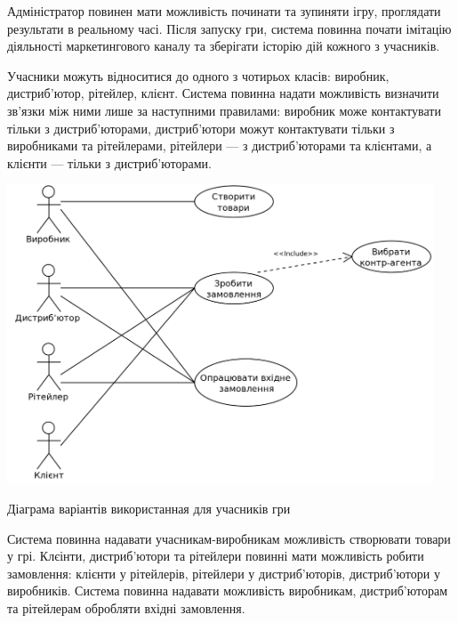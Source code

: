 \begin{longEnumerate}
\item Адміністратор повинен мати можливість починати та зупиняти ігру, проглядати результати в реальному часі. Після запуску гри, система повинна почати імітацію діяльності маркетингового каналу та зберігати історію дій кожного з учасників.
\item Учасники можуть відноситися до одного з чотирьох класів: виробник, дистриб’ютор, рітейлер, клієнт. Система повинна надати можливість визначити зв’язки між ними лише за наступними правилами: виробник може контактувати тільки з дистриб’юторами, дистриб’ютори можут контактувати тільки з виробниками та рітейлерами, рітейлери --- з дистриб’юторами та клієнтами, а клієнти --- тільки з дистриб’юторами.

            \begin{stdfigure}
                \includegraphics[width=5in]{images/uml_uc_players.png}
                \caption{Діаграма варіантів використанная для учасників гри}
                \label{fig:uml_uc_players}
            \end{stdfigure}

\item  Система повинна надавати учасникам-виробникам можливість створювати товари у грі. Клєінти, дистриб’ютори та рітейлери повинні мати можливість робити замовлення: клієнти у рітейлерів, рітейлери у дистриб’юторів, дистриб’ютори у виробників. Система повинна надавати можливість виробникам, дистриб’юторам та рітейлерам обробляти вхідні замовлення.
      \end{longEnumerate}
